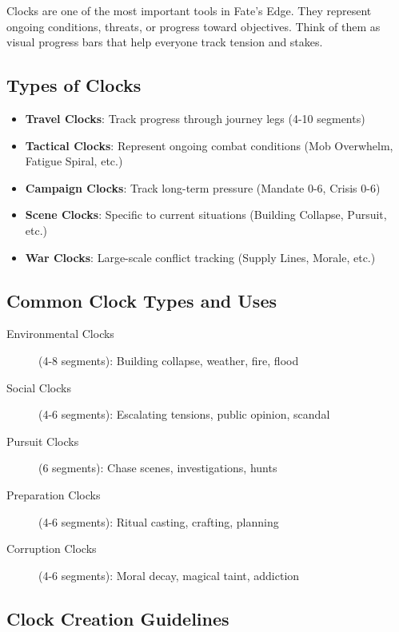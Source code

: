 Clocks are one of the most important tools in Fate's Edge. They represent ongoing conditions, threats, or progress toward objectives. Think of them as visual progress bars that help everyone track tension and stakes.

\subsection*{Types of Clocks}

\begin{itemize}
\item \textbf{Travel Clocks}: Track progress through journey legs (4-10 segments)
\item \textbf{Tactical Clocks}: Represent ongoing combat conditions (Mob Overwhelm, Fatigue Spiral, etc.)
\item \textbf{Campaign Clocks}: Track long-term pressure (Mandate 0-6, Crisis 0-6)
\item \textbf{Scene Clocks}: Specific to current situations (Building Collapse, Pursuit, etc.)
\item \textbf{War Clocks}: Large-scale conflict tracking (Supply Lines, Morale, etc.)
\end{itemize}

\subsection*{Common Clock Types and Uses}

\begin{description}
\item[Environmental Clocks] (4-8 segments): Building collapse, weather, fire, flood
\item[Social Clocks] (4-6 segments): Escalating tensions, public opinion, scandal  
\item[Pursuit Clocks] (6 segments): Chase scenes, investigations, hunts
\item[Preparation Clocks] (4-6 segments): Ritual casting, crafting, planning
\item[Corruption Clocks] (4-6 segments): Moral decay, magical taint, addiction
\end{description}

\subsection*{Clock Creation Guidelines}

